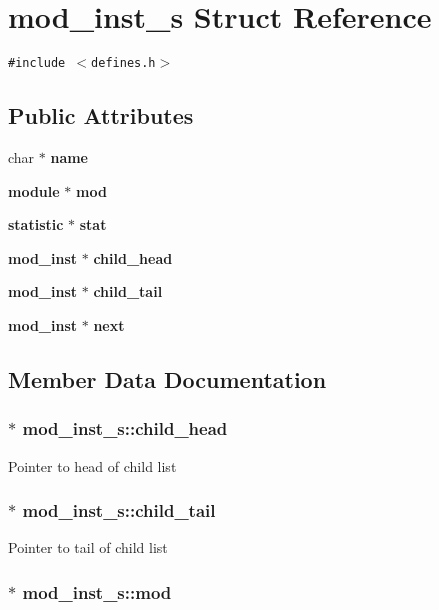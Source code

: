\section{mod\_\-inst\_\-s  Struct Reference}
\label{structmod__inst__s}
{\tt \#include $<$defines.h$>$}

\subsection*{Public Attributes}
\begin{CompactItemize}
\item 
char $\ast$ {\bf name}
\item 
{\bf module} $\ast$ {\bf mod}
\item 
{\bf statistic} $\ast$ {\bf stat}
\item 
{\bf mod\_\-inst} $\ast$ {\bf child\_\-head}
\item 
{\bf mod\_\-inst} $\ast$ {\bf child\_\-tail}
\item 
{\bf mod\_\-inst} $\ast$ {\bf next}
\end{CompactItemize}


\subsection{Member Data Documentation}
\subsubsection{$\ast$ mod\_\-inst\_\-s::child\_\-head}\label{structmod__inst__s_m3}


Pointer to head of child list 
\subsubsection{$\ast$ mod\_\-inst\_\-s::child\_\-tail}\label{structmod__inst__s_m4}


Pointer to tail of child list 
\subsubsection{$\ast$ mod\_\-inst\_\-s::mod}\label{structmod__inst__s_m1}


